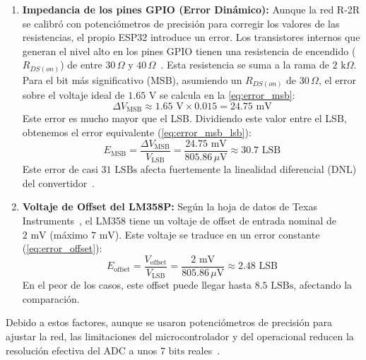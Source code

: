 \documentclass[conference]{IEEEtran}
\begin{document}
\begin{enumerate}
    \item \textbf{Impedancia de los pines GPIO (Error Dinámico):} Aunque la red R-2R se calibró con potenciómetros de precisión para corregir los valores de las resistencias, el propio ESP32 introduce un error. Los transistores internos que generan el nivel alto en los pines GPIO tienen una resistencia de encendido ($R_{DS(on)}$) de entre $30\,\Omega$ y $40\,\Omega$~\cite{esp32_datasheet}. Esta resistencia se suma a la rama de $2\text{ k}\Omega$. Para el bit más significativo (MSB), asumiendo un $R_{DS(on)}$ de $30\,\Omega$, el error sobre el voltaje ideal de $1.65\text{ V}$ se calcula en la \autoref{eq:error_msb}:
    \begin{equation}
        \Delta V_{\text{MSB}} \approx 1.65\text{ V} \times 0.015 = 24.75\text{ mV}
        \label{eq:error_msb}
    \end{equation}
    Este error es mucho mayor que el LSB. Dividiendo este valor entre el LSB, obtenemos el error equivalente (\autoref{eq:error_msb_lsb}):
    \begin{equation}
        E_{\text{MSB}} = \frac{\Delta V_{\text{MSB}}}{V_{\text{LSB}}} = \frac{24.75\text{ mV}}{805.86\,\mu\text{V}} \approx 30.7 \text{ LSB}
        \label{eq:error_msb_lsb}
    \end{equation}
    Este error de casi $31\text{ LSBs}$ afecta fuertemente la linealidad diferencial (DNL) del convertidor~\cite{Centurelli2022}.
    \item \textbf{Voltaje de Offset del LM358P:} Según la hoja de datos de Texas Instruments~\cite{lm358_datasheet}, el LM358 tiene un voltaje de offset de entrada nominal de $2\text{ mV}$ (máximo $7\text{ mV}$). Este voltaje se traduce en un error constante (\autoref{eq:error_offset}):
    \begin{equation}
        E_{\text{offset}} = \frac{V_{\text{offset}}}{V_{\text{LSB}}} = \frac{2\text{ mV}}{805.86\,\mu\text{V}} \approx 2.48 \text{ LSB}
        \label{eq:error_offset}
    \end{equation}
    En el peor de los casos, este offset puede llegar hasta $8.5 \text{ LSBs}$, afectando la comparación.
\end{enumerate}

Debido a estos factores, aunque se usaron potenciómetros de precisión para ajustar la red, las limitaciones del microcontrolador y del operacional reducen la resolución efectiva del ADC a unos $7\text{ bits}$ reales~\cite{Huang2025, Shibata2023}.
\end{document}
